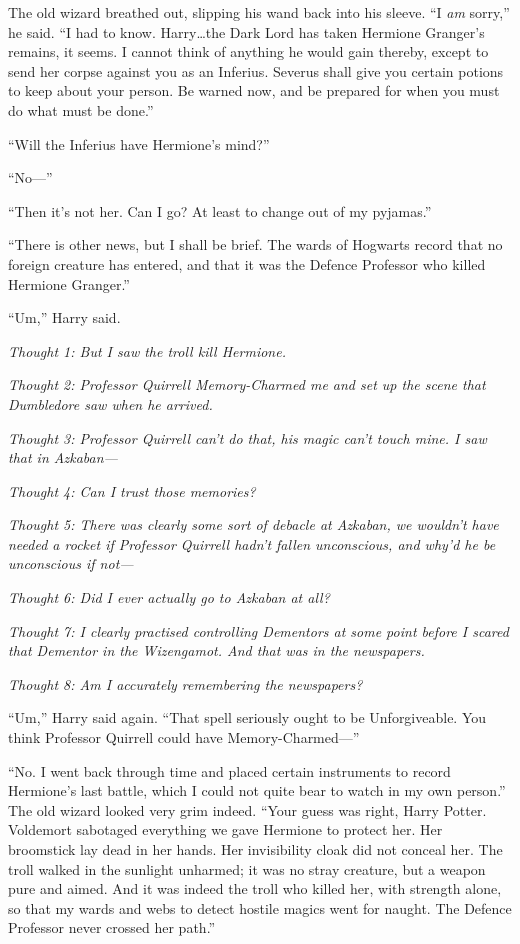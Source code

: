 The old wizard breathed out, slipping his wand back into his sleeve. “I \emph{am} sorry,” he said. “I had to know. Harry…the Dark Lord has taken Hermione Granger’s remains, it seems. I cannot think of anything he would gain thereby, except to send her corpse against you as an Inferius. Severus shall give you certain potions to keep about your person. Be warned now, and be prepared for when you must do what must be done.”

“Will the Inferius have Hermione’s mind?”

“No—”

“Then it’s not her. Can I go? At least to change out of my pyjamas.”

“There is other news, but I shall be brief. The wards of Hogwarts record that no foreign creature has entered, and that it was the Defence Professor who killed Hermione Granger.”

“Um,” Harry said.

\emph{Thought 1: But I saw the troll kill Hermione.}

\emph{Thought 2: Professor Quirrell Memory-Charmed me and set up the scene that Dumbledore saw when he arrived.}

\emph{Thought 3: Professor Quirrell can’t do that, his magic can’t touch mine. I saw that in Azkaban—}

\emph{Thought 4: Can I trust those memories?}

\emph{Thought 5: There was clearly some sort of debacle at Azkaban, we wouldn’t have needed a rocket if Professor Quirrell hadn’t fallen unconscious, and why’d he be unconscious if not—}

\emph{Thought 6: Did I ever actually go to Azkaban at all?}

\emph{Thought 7: I clearly practised controlling Dementors at some point before I scared that Dementor in the Wizengamot. And \emph{that} was in the newspapers.}

\emph{Thought 8: Am I accurately remembering the newspapers?}

“Um,” Harry said again. “That spell seriously ought to be Unforgiveable. You think Professor Quirrell could have Memory-Charmed—”

“No. I went back through time and placed certain instruments to record Hermione’s last battle, which I could not quite bear to watch in my own person.” The old wizard looked very grim indeed. “Your guess was right, Harry Potter. Voldemort sabotaged everything we gave Hermione to protect her. Her broomstick lay dead in her hands. Her invisibility cloak did not conceal her. The troll walked in the sunlight unharmed; it was no stray creature, but a weapon pure and aimed. And it was indeed the troll who killed her, with strength alone, so that my wards and webs to detect hostile magics went for naught. The Defence Professor never crossed her path.”

